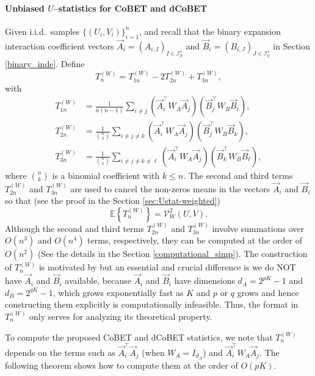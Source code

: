\documentclass[12pt,reqno,oneside]{amsbook}
\theoremstyle{definition}
\theoremstyle{remark}
\begin{document}
\paragraph{Unbiased $U$--statistics for CoBET and dCoBET}
Given i.i.d.\ samples $\{(U_i,V_i)\}_{i=1}^n$, and recall that the binary expansion interaction 
coefficient vectors
$\vec A_i=(A_{i,I})_{I\in\mathcal I_p^\star}$ and
$\vec B_i=(B_{i,J})_{J\in\mathcal I_q^\star}$ in Section \ref{binary_inde}.
Define
\[
T_n^{(W)} = T_{1n}^{(W)} - 2T_{2n}^{(W)} + T_{3n}^{(W)},
\] with
\begin{align*}
T_{1n}^{(W)} &=
\frac{1}{n(n-1)}\sum_{i\ne j}
(\vec A_i^\top W_A \vec A_j)
(\vec B_j^\top W_B \vec B_i),\\
T_{2n}^{(W)} &=
\frac{1}{\binom{n}{3}}\sum_{i\ne j\ne k}
(\vec A_i^\top W_A \vec A_j)
(\vec B_j^\top W_B \vec B_k),\\
T_{3n}^{(W)} &=
\frac{1}{\binom{n}{4}}\sum_{i\ne j\ne k\ne\ell}
(\vec A_i^\top W_A \vec A_j)
(\vec B_k^\top W_B \vec B_\ell),
\end{align*}
where $\binom{n}{k}$ is a binomial coefficient with $k\leq n$. The second and third terms $T_{2n}^{(W)}$ and $T_{3n}^{(W)}$ are used to cancel the non-zeros means in the vectors $\vec A_i$ and $\vec B_i$ so that (see the proof in the Section \ref{sec:Ustat-weighted})
\[ \mathbb E\!\left\{T_n^{(W)}\right\} = \mathcal V_W^2(U,V). \]
Although the second and third terms  $T_{2n}^{(W)}$ and $T_{3n}^{(W)}$ involve summations over $O(n^3)$ and $O(n^4)$ terms, respectively, they can be computed at the order of $O(n^2)$ (See the details in the Section \ref{computational_simp}).
The construction of $T_n^{(W)}$ is motivated by \cite{CZZ2010} 
but an essential and crucial difference is we do NOT have $\vec A_i$ and $\vec B_i$ available,
because $\vec A_i$ and $\vec B_i$ have dimensions $d_A=2^{pK}-1$ and $d_B=2^{qK}-1$, which grows exponentially fast as $K$ and $p$ or $q$ grows and hence constructing them explicitly is computationally infeasible. 
Thus, the format in $T_n^{(W)}$ only serves for analyzing its theoretical property. 

To compute the proposed CoBET and dCoBET statistics, we note that $T_n^{(W)}$ depends on the terms such as $\vec A_i^\top \vec A_j$ (when $W_A=I_{d_A}$) and 
$\vec A_i^\top W_A \vec A_j$. The following theorem shows how to compute them
at the order of $O(pK)$. 
\end{document}
